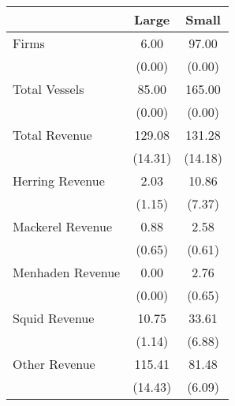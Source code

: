 \begin{tabular}{l*{2}{c}}
\hline\hline
                &    Large&    Small\\
\hline
Firms           &     6.00&    97.00\\
                &   (0.00)&   (0.00)\\
Total Vessels   &    85.00&   165.00\\
                &   (0.00)&   (0.00)\\
Total Revenue   &   129.08&   131.28\\
                &  (14.31)&  (14.18)\\
Herring Revenue &     2.03&    10.86\\
                &   (1.15)&   (7.37)\\
Mackerel Revenue&     0.88&     2.58\\
                &   (0.65)&   (0.61)\\
Menhaden Revenue&     0.00&     2.76\\
                &   (0.00)&   (0.65)\\
Squid Revenue   &    10.75&    33.61\\
                &   (1.14)&   (6.88)\\
Other Revenue   &   115.41&    81.48\\
                &  (14.43)&   (6.09)\\
\hline\hline
\end{tabular}
